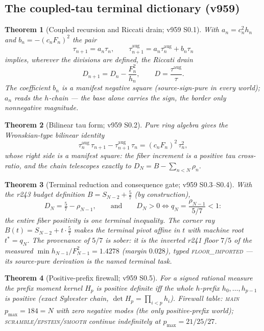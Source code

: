 \documentclass[11pt]{article}
\newtheorem{theorem}{Theorem}[section]
\theoremstyle{definition}
\theoremstyle{remark}
\newcommand{\taua}{\tau^{\mathrm{aug}}}
\begin{document}
\subsection{The coupled-tau terminal dictionary (v959)}\label{sec:v959}

\begin{theorem}[Coupled recursion and Riccati drain; v959 S0.1]\label{thm:drain}
With $a_n=c_n^2h_n$ and $b_n=-(c_nF_n)^2$ the pair
\[
\tau_{n+1}=a_n\tau_n,\qquad
\taua_{n+1}=a_n\taua_n+b_n\tau_n
\]
implies, wherever the divisions are defined, the Riccati drain
\[
D_{n+1}=D_n-\frac{F_n^2}{h_n},\qquad D=\frac{\taua}{\tau}.
\]
The coefficient $b_n$ is a manifest negative square (source-sign-pure in
every world); $a_n$ reads the $h$-chain --- \emph{the base alone carries
the sign, the border only nonnegative magnitude}.
\end{theorem}

\begin{theorem}[Bilinear tau form; v959 S0.2]\label{thm:bilinear}
Pure ring algebra gives the Wronskian-type bilinear identity
\[
\taua_n\,\tau_{n+1}-\taua_{n+1}\,\tau_n=(c_nF_n)^2\,\tau_n^2 ,
\]
whose right side is a manifest square: the fiber increment is a positive
tau cross-ratio, and the chain telescopes exactly to
$D_N=B-\sum_{n<N}\rho_n$.
\end{theorem}

\begin{theorem}[Terminal reduction and consequence gate; v959 S0.3--S0.4]\label{thm:terminal}
With the r243 budget definition $B=S_{N-2}+\tfrac57$ (by construction),
\[
D_N=\tfrac57-\rho_{N-1},\qquad\text{and}\qquad
D_N>0 \iff q_N=\frac{\rho_{N-1}}{5/7}<1 :
\]
the \emph{entire} fiber positivity is one terminal inequality.  The corner
ray $B(t)=S_{N-2}+t\cdot\tfrac57$ makes the terminal pivot affine in $t$
with machine root $t^{*}=q_N$.  The provenance of $5/7$ is sober: it is
the inverted r241 floor $7/5$ of the \emph{measured}
$\min h_{N-1}/F_{N-1}^2=1.4278$ (margin $0.028$), typed
\textsc{floor\_imported} --- its source-pure derivation is the named
terminal task.
\end{theorem}

\begin{theorem}[Positive-prefix firewall; v959 S0.5]\label{thm:firewall}
For a signed rational measure the prefix moment kernel $H_p$ is positive
definite iff the whole $h$-prefix $h_0,\dots,h_{p-1}$ is positive (exact
Sylvester chain, $\det H_p=\prod_{i<p}h_i$).  Firewall table: \textsc{main}
$p_{\max}=184=N$ with zero negative modes (the only positive-prefix
world); \textsc{scramble}/\textsc{epstein}/\textsc{smooth} continue
indefinitely at $p_{\max}=21/25/27$.
\end{theorem}
\end{document}
